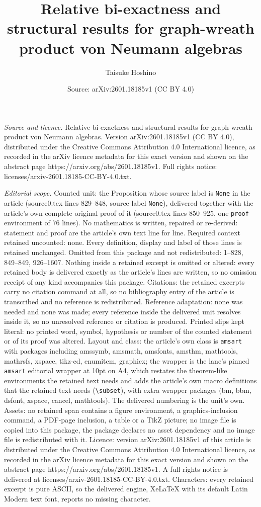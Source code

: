 \documentclass[10pt,a4paper]{amsart}
\title[Relative bi-exactness and structural results for graph-wreat]{Relative bi-exactness and structural results for graph-wreath product von Neumann algebras}
\author{Taisuke Hoshino}
\date{Source: arXiv:2601.18185v1 (CC BY 4.0)}
\begin{document}
\maketitle

\noindent\emph{Source and licence.} Relative bi-exactness and structural results for graph-wreath product von Neumann algebras. Version arXiv:2601.18185v1 (CC BY 4.0), distributed under the Creative Commons Attribution 4.0 International licence, as recorded in the arXiv licence metadata for this exact version and shown on the abstract page https://arxiv.org/abs/2601.18185v1. Full rights notice: licenses/arxiv-2601.18185-CC-BY-4.0.txt.\par\smallskip

\noindent\textit{Editorial scope.} Counted unit: the Proposition whose source label is \texttt{None} in the article (source0.tex lines 829--848, source label \texttt{None}), delivered together with the article's own complete original proof of it (source0.tex lines 850--925, one \texttt{proof} environment of 76 lines). No mathematics is written, repaired or re-derived: statement and proof are the article's own text line for line. Required context retained uncounted: none. Every definition, display and label of those lines is retained unchanged. Omitted from this package and not redistributed: 1--828, 849--849, 926--1607. Nothing inside a retained excerpt is omitted or altered: every retained body is delivered exactly as the article's lines are written, so no omission receipt of any kind accompanies this package. Citations: the retained excerpts carry no citation command at all, so no bibliography entry of the article is transcribed and no reference is redistributed. Reference adaptation: none was needed and none was made; every reference inside the delivered unit resolves inside it, so no unresolved reference or citation is produced. Printed slips kept literal: no printed word, symbol, hypothesis or number of the counted statement or of its proof was altered. Layout and class: the article's own class is \texttt{amsart} with packages including amssymb, amsmath, amsfonts, amsthm, mathtools, mathrsfs, xspace, tikz-cd, enumitem, graphicx; the wrapper is the lane's pinned \texttt{amsart} editorial wrapper at 10pt on A4, which restates the theorem-like environments the retained text needs and adds the article's own macro definitions that the retained text needs (\texttt{\textbackslash subset}), with extra wrapper packages (bm, bbm, dsfont, xspace, cancel, mathtools). The delivered numbering is the unit's own. Assets: no retained span contains a figure environment, a graphics-inclusion command, a PDF-page inclusion, a table or a TikZ picture; no image file is copied into this package, the package declares no asset dependency and no image file is redistributed with it. Licence: version arXiv:2601.18185v1 of this article is distributed under the Creative Commons Attribution 4.0 International licence, as recorded in the arXiv licence metadata for this exact version and shown on the abstract page https://arxiv.org/abs/2601.18185v1. A full rights notice is delivered at licenses/arxiv-2601.18185-CC-BY-4.0.txt. Characters: every retained excerpt is pure ASCII, so the delivered engine, XeLaTeX with its default Latin Modern text font, reports no missing character.
\end{document}
